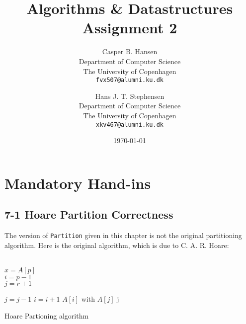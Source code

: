 \documentclass[11pt,english]{article}
\title
{
	\vspace{1in}
	Algorithms \& Datastructures\\
	\huge Assignment 2
}
\author
{
	Casper B. Hansen\\
	\small Department of Computer Science\\
	\small The University of Copenhagen\\
	\texttt{fvx507@alumni.ku.dk}
	\and
	Hans J. T. Stephensen\\
	\small Department of Computer Science\\
	\small The University of Copenhagen\\
	\texttt{xkv467@alumni.ku.dk}
}
\date{\today}
\begin{document}
\clearpage
\maketitle
\thispagestyle{empty}


\newpage
\pagestyle{fancy}

\section*{Mandatory Hand-ins}

\subsection*{7-1 Hoare Partition Correctness}
The version of \texttt{Partition} given in this chapter is not the original
partitioning algorithm. Here is the original algorithm, which is due to C. A.
R. Hoare:
\\\\
\begin{algorithm}[H]
	
	\BlankLine
	
	$x = A[p]$\\
	$i = p - 1$\\
	$j = r + 1$
	
	\While{\True}
	{
		{
			$j = j - 1$
		}
		{
			$i = i + 1$
		}
		{
			\Exchange $A[i]$ with $A[j]$
		}
		\Else
		{
			\Return j
		}
	}

	\caption{Hoare Partioning algorithm}
\end{algorithm}
\end{document}
